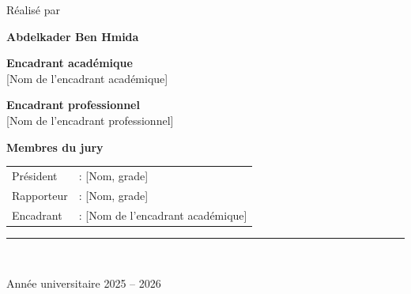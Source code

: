 \documentclass[12pt,a4paper,twoside,openright]{report}
\makeatletter
\def\cleardoublepage{\clearpage\if@twoside
  \ifodd\c@page\else\hbox{}\thispagestyle{empty}\newpage\fi\fi}
\newcommand{\anneeuniv}{Année universitaire 2025 -- 2026}
\newcommand{\auteur}{Abdelkader Ben Hmida}
\newcommand{\encadrantacad}{[Nom de l'encadrant académique]}
\newcommand{\encadrantpro}{[Nom de l'encadrant professionnel]}
\makeatother
\begin{document}
\begin{titlepage}
\vspace{1.0cm}
{\sffamily\large Réalisé par\par}
\vspace{0.15cm}
{\sffamily\LARGE\bfseries \auteur\par}

\vfill

\begin{minipage}[t]{0.48\textwidth}
  \raggedright\sffamily\small
  \textbf{Encadrant académique}\\[2pt] \encadrantacad
\end{minipage}\hfill
\begin{minipage}[t]{0.48\textwidth}
  \raggedleft\sffamily\small
  \textbf{Encadrant professionnel}\\[2pt] \encadrantpro
\end{minipage}

\vspace{0.7cm}
{\sffamily\small\textbf{Membres du jury}\par}
\vspace{3pt}
{\sffamily\small
\begin{tabular}{@{}ll@{}}
Président & : [Nom, grade] \\
Rapporteur & : [Nom, grade] \\
Encadrant & : \encadrantacad \\
\end{tabular}\par}

\vspace{0.7cm}
{\color{pfeaccent}\rule{\textwidth}{1.2pt}}\\[0.25cm]
{\sffamily\normalsize \anneeuniv\par}
\end{titlepage}

\cleardoublepage
{}

\end{document}

